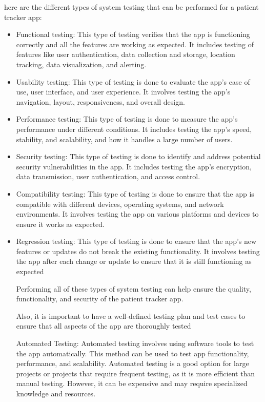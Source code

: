 \documentclass[12pt]{article}
\begin{document}
			here are the different types of system testing that can be performed for a patient tracker app:
			\begin{itemize}
				
		
			\item 	Functional testing: This type of testing verifies that the app is functioning correctly and all the features are working as expected. It includes testing of features like user authentication, data collection and storage, location tracking, data visualization, and alerting.
			
			\item 	Usability testing: This type of testing is done to evaluate the app's ease of use, user interface, and user experience. It involves testing the app's navigation, layout, responsiveness, and overall design.
			
			\item 	Performance testing: This type of testing is done to measure the app's performance under different conditions. It includes testing the app's speed, stability, and scalability, and how it handles a large number of users.
			
			\item 	Security testing: This type of testing is done to identify and address potential security vulnerabilities in the app. It includes testing the app's encryption, data transmission, user authentication, and access control.
			
			\item 	Compatibility testing: This type of testing is done to ensure that the app is compatible with different devices, operating systems, and network environments. It involves testing the app on various platforms and devices to ensure it works as expected.
			
			\item 	Regression testing: This type of testing is done to ensure that the app's new features or updates do not break the existing functionality. It involves testing the app after each change or update to ensure that it is still functioning as expected
			
			\quad Performing all of these types of system testing can help ensure the quality, functionality, and security of the patient tracker app.
			
			
			\quad Also, it is important to have a well-defined testing plan and test cases to ensure that all aspects of the app are thoroughly tested
			
			\quad Automated Testing: Automated testing involves using software tools to test the app automatically. This method can be used to test app functionality, performance, and scalability. Automated testing is a good option for large projects or projects that require frequent testing, as it is more efficient than manual testing. However, it can be expensive and may require specialized knowledge and resources.
			

\end{itemize}
\end{document}
